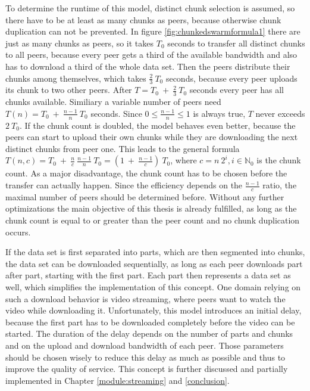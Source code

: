 To determine the runtime of this model, distinct chunk selection is assumed, so there have to be at least as many chunks as peers, because otherwise chunk duplication can not be prevented. In figure \ref{fig:chunkedswarmformula1} there are just as many chunks as peers, so it takes $T_0$ seconds to transfer all distinct chunks to all peers, because every peer gets a third of the available bandwidth and also has to download a third of the whole data set. Then the peers distribute their chunks among themselves, which takes $\frac{2}{3}\:T_0$ seconds, because every peer uploads its chunk to two other peers. After $T = T_0\:+\:\frac{2}{3}\:T_0$ seconds every peer has all chunks available. Similiary a variable number of peers need $T(n) = T_0\:+\:\frac{n - 1}{n}\:T_0$ seconds. Since $0 \leq \frac{n - 1}{n} \leq 1$ is always true, $T$ never exceeds $2\:T_0$. If the chunk count is doubled, the model behaves even better, because the peers can start to upload their own chunks while they are downloading the next distinct chunks from peer one. This leads to the general formula $T(n, c) = T_0\:+\:\frac{n}{c}\:\frac{n-1}{n}\:T_0 = (1\:+\:\frac{n-1}{c})\:T_0$, where $c = n\:2^i, i \in \mathbb{N}_0$ is the chunk count. As a major disadvantage, the chunk count has to be chosen before the transfer can actually happen. Since the efficiency depends on the $\frac{n-1}{c}$ ratio, the maximal number of peers should be determined before. Without any further optimizations the main objective of this thesis is already fulfilled, as long as the chunk count is equal to or greater than the peer count and no chunk duplication occurs.

If the data set is first separated into parts, which are then segmented into chunks, the data set can be downloaded sequentially, as long as each peer downloads part after part, starting with the first part. Each part then represents a data set as well, which simplifies the implementation of this concept. One domain relying on such a download behavior is video streaming, where peers want to watch the video while downloading it. Unfortunately, this model introduces an initial delay, because the first part has to be downloaded completely before the video can be started. The duration of the delay depends on the number of parts and chunks and on the upload and download bandwidth of each peer. Those parameters should be chosen wisely to reduce this delay as much as possible and thus to improve the quality of service. This concept is further discussed and partially implemented in Chapter \ref{module:streaming} and \ref{conclusion}.

